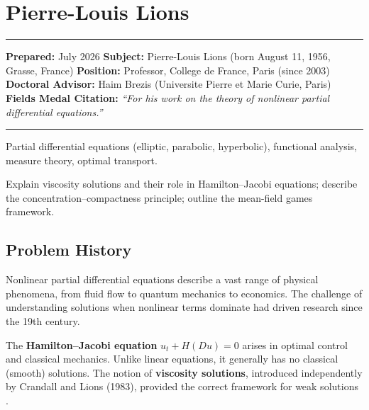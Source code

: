 \chapter{Pierre-Louis Lions}\label{ch1994pierrelouislions:pierre-louis-lions-fields-medal-1994-a-comprehensive-report-on-his-work-and-impact}

\begin{center}\rule{0.5\linewidth}{0.5pt}\end{center}

\textbf{Prepared:} July 2026
\textbf{Subject:} Pierre-Louis Lions (born August 11, 1956, Grasse, France)
\textbf{Position:} Professor, College de France, Paris (since 2003)
\textbf{Doctoral Advisor:} Haim Brezis (Universite Pierre et Marie Curie, Paris)
\textbf{Fields Medal Citation:} \emph{``For his work on the theory of
nonlinear partial differential equations.''}

\begin{center}\rule{0.5\linewidth}{0.5pt}\end{center}

\begin{prereqs}
Partial differential equations (elliptic, parabolic, hyperbolic),
functional analysis, measure theory, optimal transport.
\end{prereqs}

\begin{objectives}
Explain viscosity solutions and their role in Hamilton--Jacobi
equations; describe the concentration--compactness principle;
outline the mean-field games framework.
\end{objectives}

\section{Problem History}

Nonlinear partial differential equations describe a vast range of
physical phenomena, from fluid flow to quantum mechanics to
economics.  The challenge of understanding solutions when nonlinear
terms dominate had driven research since the 19th century.

The \textbf{Hamilton--Jacobi equation} $u_t + H(Du) = 0$ arises in
optimal control and classical mechanics.  Unlike linear equations,
it generally has no classical (smooth) solutions.  The notion of
\textbf{viscosity solutions}, introduced independently by Crandall
and Lions (1983), provided the correct framework for weak solutions \cite{lions1982}.


